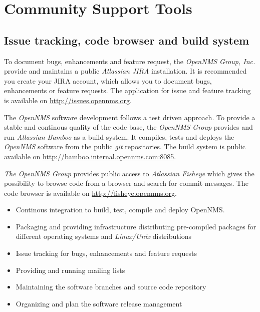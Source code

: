 \section{Community Support Tools}



\subsection*{Issue tracking, code browser and build system}
To document bugs, enhancements and feature request, the \emph{OpenNMS Group, Inc.} provide and maintains a public \emph{Atlassian JIRA} installation. It is recommended you create your JIRA account, which allows you to document bugs, enhancements or feature requests. The application for issue and feature tracking is available on \url{http://issues.opennms.org}.

The \emph{OpenNMS} software development follows a test driven approach. To provide a stable and continous quality of the code base, the \emph{OpenNMS Group} provides and run \emph{Atlassian Bamboo} as a build system. It compiles, tests and deploys the \emph{OpenNMS} software from the public \emph{git} repositories. The build system is public available on \url{http://bamboo.internal.opennms.com:8085}.

\emph{The OpenNMS Group} provides public access to \emph{Atlassian Fisheye} which gives the possibility to browse code from a browser and search for commit messages. The code browser is available on \url{http://fisheye.opennms.org}.

\begin{itemize}
  \item Continous integration to build, test, compile and deploy OpenNMS.
  \item Packaging and providing infrastructure distributing pre-compiled packages for different operating systems and \emph{Linux/Unix} distributions
  \item Issue tracking for bugs, enhancements and feature requests
  \item Providing and running mailing lists
  \item Maintaining the software branches and source code repository
  \item Organizing and plan the software release management
\end{itemize}